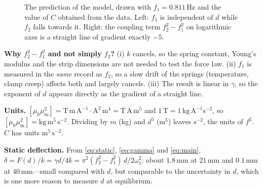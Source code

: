 \documentclass[11pt,a4paper]{article}
\newcommand{\muz}{\mu_0}
\newcommand{\mum}{\mu_{\mathrm m}}
\newcommand{\un}[1]{\,\mathrm{#1}}
\begin{document}
\begin{figure}[htbp]
\centering
{}\hfill
{}
\caption{The prediction of the model, drawn with $f_1=0.811\un{Hz}$ and the value of $C$ obtained from the data. Left: $f_1$ is independent of $d$ while $f_2$ falls towards it. Right: the coupling term $f_2^2-f_1^2$ on logarithmic axes is a straight line of gradient exactly $-5$.}
\label{fig:prediction}
\end{figure}

\begin{notebox}
\textbf{Why $f_2^2-f_1^2$ and not simply $f_2$?} (i) $k$ cancels, so the spring constant, Young's modulus and the strip dimensions are not needed to test the force law. (ii) $f_1$ is measured in the \emph{same} record as $f_2$, so a slow drift of the springs (temperature, clamp creep) affects both and largely cancels. (iii) The result is linear in $\gamma$, so the exponent of $d$ appears directly as the gradient of a straight line.

\textbf{Units.} $[\muz\mum^2]=\mathrm{T\,m\,A^{-1}\cdot A^2\,m^4}=\mathrm{T\,A\,m^5}$ and $1\un{T}=1\un{kg\,A^{-1}s^{-2}}$, so $[\muz\mum^2]=\mathrm{kg\,m^5\,s^{-2}}$. Dividing by $m$ (kg) and $d^5$ ($\mathrm{m^5}$) leaves $\mathrm{s^{-2}}$, the units of $f^2$. $C$ has units $\mathrm{m^5\,s^{-2}}$.

\textbf{Static deflection.} From \eqref{eq:static}, \eqref{eq:gamma} and \eqref{eq:main}, $\delta=F(d)/k=\gamma d/4k=\pi^2(f_2^2-f_1^2)\,d/2\omega_1^2$: about $1.8\un{mm}$ at $21\un{mm}$ and $0.1\un{mm}$ at $40\un{mm}$---small compared with $d$, but comparable to the uncertainty in $d$, which is one more reason to measure $d$ at equilibrium.
\end{notebox}
\end{document}
